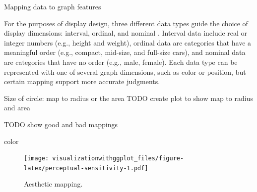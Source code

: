 \documentclass[]{krantz}
\makeatletter
\newenvironment{Shaded}{\begin{snugshade}}{\end{snugshade}}
\newcommand{\DataTypeTok}[1]{\textcolor[rgb]{0.13,0.29,0.53}{#1}}
\newcommand{\DecValTok}[1]{\textcolor[rgb]{0.00,0.00,0.81}{#1}}
\newcommand{\FloatTok}[1]{\textcolor[rgb]{0.00,0.00,0.81}{#1}}
\newcommand{\KeywordTok}[1]{\textcolor[rgb]{0.13,0.29,0.53}{\textbf{#1}}}
\newcommand{\NormalTok}[1]{#1}
\newcommand{\OperatorTok}[1]{\textcolor[rgb]{0.81,0.36,0.00}{\textbf{#1}}}
\newcommand{\StringTok}[1]{\textcolor[rgb]{0.31,0.60,0.02}{#1}}
\newenvironment{kframe}{%
\medskip{}
\setlength{\fboxsep}{.8em}
 \def\at@end@of@kframe{}%
 \ifinner\ifhmode%
  \def\at@end@of@kframe{\end{minipage}}%
  \begin{minipage}{\columnwidth}%
 \fi\fi%
 \def\FrameCommand##1{\hskip\@totalleftmargin \hskip-\fboxsep
 \colorbox{shadecolor}{##1}\hskip-\fboxsep
     \hskip-\linewidth \hskip-\@totalleftmargin \hskip\columnwidth}%
 \MakeFramed {\advance\hsize-\width
   \@totalleftmargin\z@ \linewidth\hsize
   \@setminipage}}%
 {\par\unskip\endMakeFramed%
 \at@end@of@kframe}
\renewenvironment{Shaded}{\begin{kframe}}{\end{kframe}}
\makeatother
\begin{document}
Mapping data to graph features \citep{Cleveland1985}

For the purposes of display design, three different data types guide the choice of display dimensions: interval, ordinal, and nominal \citep{Cleveland1985}. Interval data include real or integer numbers (e.g., height and weight), ordinal data are categories that have a meaningful order (e.g., compact, mid-size, and full-size cars), and nominal data are categories that have no order (e.g., male, female). Each data type can be represented with one of several graph dimensions, such as color or position, but certain mapping support more accurate judgments.

Size of circle: map to radius or the area
TODO create plot to show map to radius and area

TODO show good and bad mappings

color \citep{Silva2011}

\begin{Shaded}
\end{Shaded}

\begin{figure}
\centering
\texttt{[image: visualizationwithggplot\_files/figure-latex/perceptual-sensitivity-1.pdf]}
\caption{\label{fig:perceptual-sensitivity}Aesthetic mapping.}
\end{figure}
\end{document}
